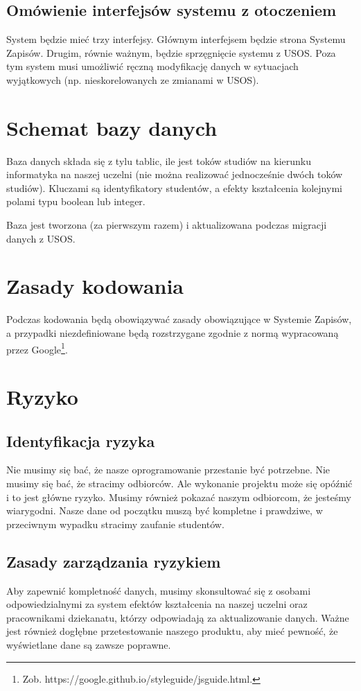 \documentclass{article}
\begin{document}
\subsection{Omówienie interfejsów systemu z otoczeniem}
System będzie mieć trzy interfejsy.
Głównym interfejsem będzie strona Systemu Zapisów.
Drugim, równie ważnym, będzie sprzęgnięcie systemu z USOS.
Poza tym system musi umożliwić ręczną modyfikację danych w sytuacjach wyjątkowych (np. nieskorelowanych ze zmianami w USOS).


\section{Schemat bazy danych}
Baza danych składa się z tylu tablic, ile jest toków studiów na kierunku informatyka na naszej uczelni (nie można realizować jednocześnie dwóch toków studiów).
Kluczami są identyfikatory studentów, a efekty kształcenia kolejnymi polami typu boolean lub integer.

Baza jest tworzona (za pierwszym razem) i aktualizowana podczas migracji danych z USOS.


\section{Zasady kodowania}
Podczas kodowania będą obowiązywać zasady obowiązujące w Systemie Zapisów, a przypadki niezdefiniowane będą rozstrzygane zgodnie z normą wypracowaną przez Google\footnote{Zob. https://google.github.io/styleguide/jsguide.html.}.


\section{Ryzyko}

\subsection{Identyfikacja ryzyka}
Nie musimy się bać, że nasze oprogramowanie przestanie być potrzebne. Nie musimy się bać, że stracimy odbiorców. Ale wykonanie projektu może się opóźnić i to jest główne ryzyko.
Musimy również pokazać naszym odbiorcom, że jesteśmy wiarygodni. Nasze dane od początku muszą być kompletne i prawdziwe, w przeciwnym wypadku stracimy zaufanie studentów.

\subsection{Zasady zarządzania ryzykiem}
Aby zapewnić kompletność danych, musimy skonsultować się z osobami odpowiedzialnymi za system efektów kształcenia na naszej uczelni oraz pracownikami dziekanatu, którzy odpowiadają za aktualizowanie danych.
Ważne jest również dogłębne przetestowanie naszego produktu, aby mieć pewność, że wyświetlane dane są zawsze poprawne.
\end{document}
